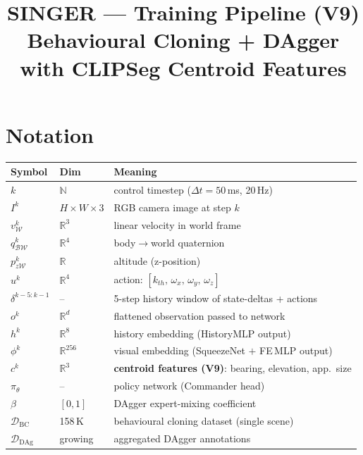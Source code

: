 \documentclass[11pt, a4paper]{article}
\title{\textbf{SINGER --- Training Pipeline (V9)}\\
       \large Behavioural Cloning + DAgger with CLIPSeg Centroid Features}
\author{}
\date{}
\newcommand{\D}{\mathcal{D}}
\newcommand{\R}{\mathbb{R}}
\newcommand{\Bw}{\mathcal{BW}}
\newcommand{\W}{\mathcal{W}}
\begin{document}
\maketitle
\tableofcontents
\bigskip

\section{Notation}

\begin{center}
\begin{tabular}{lll}
\toprule
\textbf{Symbol} & \textbf{Dim} & \textbf{Meaning} \\
\midrule
$k$                  & $\mathbb{N}$ & control timestep ($\Delta t = 50$\,ms, 20\,Hz) \\
$I^k$                & $H{\times}W{\times}3$ & RGB camera image at step $k$ \\
$v_{\W}^k$           & $\R^3$       & linear velocity in world frame \\
$q_{\Bw}^k$          & $\R^4$       & body$\to$world quaternion \\
$p_{z\W}^k$          & $\R$         & altitude (z-position) \\
$u^k$                & $\R^4$       & action: $[k_{th},\,\omega_x,\,\omega_y,\,\omega_z]$ \\[2pt]
$\delta^{k-5:k-1}$   & --           & 5-step history window of state-deltas + actions \\
$o^k$                & $\R^d$       & flattened observation passed to network \\[2pt]
$h^k$                & $\R^{8}$     & history embedding (HistoryMLP output) \\
$\phi^k$             & $\R^{256}$   & visual embedding (SqueezeNet $+$ FE\,MLP output) \\
$c^k$                & $\R^3$       & \textbf{centroid features (V9)}: bearing, elevation, app.\ size \\
$\pi_\theta$         & --           & policy network (Commander head) \\
$\beta$              & $[0,1]$      & DAgger expert-mixing coefficient \\
$\D_{\text{BC}}$     & 158\,K       & behavioural cloning dataset (single scene) \\
$\D_{\text{DAg}}$    & growing      & aggregated DAgger annotations \\
\bottomrule
\end{tabular}
\end{center}
\end{document}
